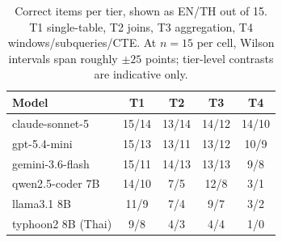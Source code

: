 \begin{table}[t]
\caption{Correct items per tier, shown as EN/TH out of 15. T1
single-table, T2 joins, T3 aggregation, T4 windows/subqueries/CTE.
At $n{=}15$ per cell, Wilson intervals span roughly $\pm25$ points;
tier-level contrasts are indicative only.}
\label{tab:tiers}
\centering\small
\begin{tabular}{lcccc}
\toprule
Model & T1 & T2 & T3 & T4 \\
\midrule
claude-sonnet-5 & 15/14 & 13/14 & 14/12 & 14/10 \\
gpt-5.4-mini & 15/13 & 13/11 & 13/12 & 10/9 \\
gemini-3.6-flash & 15/11 & 14/13 & 13/13 & 9/8 \\
qwen2.5-coder 7B & 14/10 & 7/5 & 12/8 & 3/1 \\
llama3.1 8B & 11/9 & 7/4 & 9/7 & 3/2 \\
typhoon2 8B (Thai) & 9/8 & 4/3 & 4/4 & 1/0 \\
\bottomrule
\end{tabular}
\end{table}
